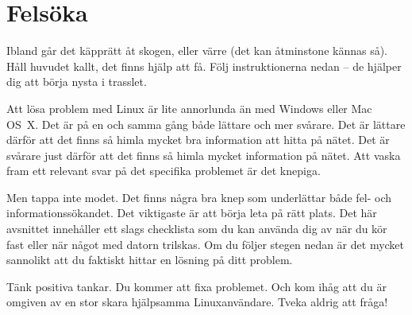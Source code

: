 \documentclass[a4paper,final]{memoir} %
\begin{document}



\section{Felsöka}\label{sec:felsoka}

Ibland går det käpprätt åt skogen, eller värre (det kan åtminstone kännas så). Håll huvudet kallt, det finns hjälp att få. Följ instruktionerna nedan -- de hjälper dig att börja nysta i trasslet.

Att lösa problem med Linux är lite annorlunda än med Windows eller Mac OS~X. Det är på en och samma gång både lättare och mer svårare. Det är lättare därför att det finns så himla mycket bra information att hitta på nätet. Det är svårare just därför att det finns så himla mycket information på nätet. Att vaska fram ett relevant svar på det specifika problemet är det knepiga.

Men tappa inte modet. Det finns några bra knep som underlättar både fel- och informationssökandet. Det viktigaste är att börja leta på rätt plats. Det här avsnittet innehåller ett slags checklista som du kan använda dig av när du kör fast eller när något med datorn trilskas. Om du följer stegen nedan är det mycket sannolikt att du faktiskt hittar en lösning på ditt problem. 

Tänk positiva tankar. Du kommer att fixa problemet. Och kom ihåg att du är omgiven av en stor skara hjälpsamma Linuxanvändare. Tveka aldrig att fråga!

\end{document}
